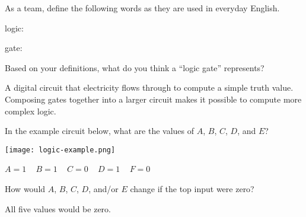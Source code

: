 \Q As a team, define the following words as they are used in everyday English.

\begin{description}
\item logic: 
\item gate: 
\end{description}


\Q Based on your definitions, what do you think a ``logic gate'' represents?

\begin{answer}
A digital circuit that electricity flows through to compute a simple truth value.
Composing gates together into a larger circuit makes it possible to compute more complex logic.
\end{answer}


\Q In the example circuit below, what are the values of $A$, $B$, $C$, $D$, and $E$?

\vspace{1em}
\begin{minipage}{0.45\textwidth}
\texttt{[image: logic-example.png]}
\end{minipage}
\hspace{1em}
\begin{minipage}{0.45\textwidth}
\begin{answer}
$A=1$ ~ $B=1$ ~ $C=0$ ~ $D=1$ ~ $F=0$
\end{answer}
\end{minipage}
\vspace{1em}


\Q How would $A$, $B$, $C$, $D$, and/or $E$ change if the top input were zero?

\begin{answer}
All five values would be zero.
\end{answer}
